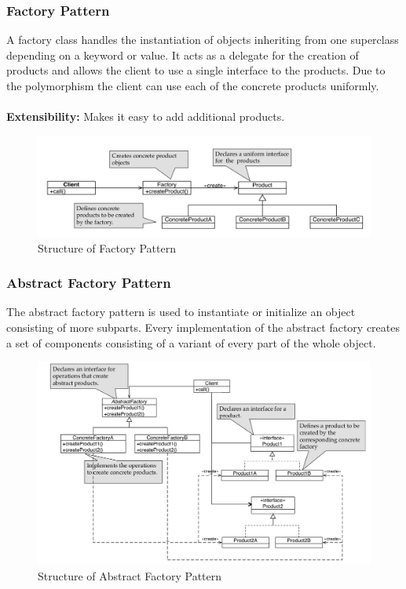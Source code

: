 \subsubsection{Factory Pattern}
A factory class handles the instantiation of objects inheriting from one superclass depending on a keyword or value. It acts as a delegate for the creation of products and allows the client to use a single interface to the products. Due to the polymorphism the client can use each of the concrete products uniformly.\\\\
\textbf{Extensibility:} Makes it easy to add additional products.
\begin{figure}[h]
	\centering
	\includegraphics[width=\linewidth]{images/pattern_factory.png}
	\caption{Structure of Factory Pattern}
\end{figure}
\newpage

\subsubsection{Abstract Factory Pattern}
The abstract factory pattern is used to instantiate or initialize an object consisting of more subparts.
Every implementation of the abstract factory creates a set of components consisting of a variant of every part of the whole object.

\begin{figure}[h]
	\centering
	\includegraphics[width=\linewidth]{images/pattern_abstract_factory.png}
	\caption{Structure of Abstract Factory Pattern}
\end{figure}
\newpage


